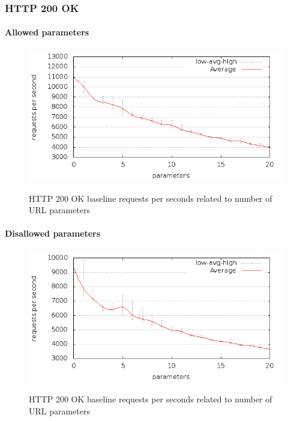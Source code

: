 \documentclass[Measurements]{subfiles}
\begin{document}
\subsubsection{HTTP 200 OK}

\paragraph{Allowed parameters}

\begin{figure}[H]
\caption{HTTP 200 OK baseline requests per seconds related to number of URL parameters}
\centering
\includegraphics[scale=0.55] {images/results/200_with_naxsi_incremented_allowed_parameters/output.png}
\label{fig:Baseline performance measurement}
\end{figure}

\paragraph{Disallowed parameters}

\begin{figure}[H]
\caption{HTTP 200 OK baseline requests per seconds related to number of URL parameters}
\centering
\includegraphics[scale=0.55] {images/results/200_with_naxsi_incremented_disallowed_parameters/output.png}
\label{fig:Baseline performance measurement}
\end{figure}
\end{document}
